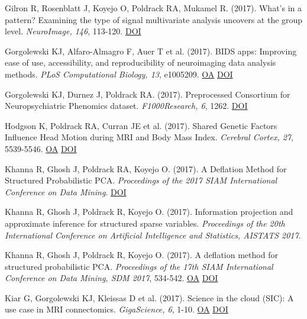 \documentclass[10pt, letterpaper]{article}
\begin{document}
Gilron R, Rosenblatt J, Koyejo O, Poldrack RA, Mukamel R.  (2017). What's in a pattern? Examining the type of signal multivariate analysis uncovers at the group level. \textit{NeuroImage, 146}, 113-120. \href{https://doi.org/10.1016/j.neuroimage.2016.11.019}{DOI} \vspace{2mm}

Gorgolewski KJ, Alfaro-Almagro F, Auer T et al. (2017). BIDS apps: Improving ease of use, accessibility, and reproducibility of neuroimaging data analysis methods. \textit{PLoS Computational Biology, 13}, e1005209. \href{https://www.ncbi.nlm.nih.gov/pmc/articles/PMC5363996}{OA} \href{https://doi.org/10.1371/journal.pcbi.1005209}{DOI} \vspace{2mm}

Gorgolewski KJ, Durnez J, Poldrack RA.  (2017). Preprocessed Consortium for Neuropsychiatric Phenomics dataset. \textit{F1000Research, 6}, 1262. \href{https://doi.org/10.12688/f1000research.11964.2}{DOI} \vspace{2mm}

Hodgson K, Poldrack RA, Curran JE et al. (2017). Shared Genetic Factors Influence Head Motion during MRI and Body Mass Index. \textit{Cerebral Cortex, 27}, 5539-5546. \href{https://www.ncbi.nlm.nih.gov/pmc/articles/PMC6075600}{OA} \href{https://doi.org/10.1093/cercor/bhw321}{DOI} \vspace{2mm}

Khanna R, Ghosh J, Poldrack RA, Koyejo O.  (2017). A Deflation Method for Structured Probabilistic PCA. \textit{Proceedings of the 2017 SIAM International Conference on Data Mining}. \href{https://doi.org/10.1137/1.9781611974973.60}{DOI} \vspace{2mm}

Khanna R, Ghosh J, Poldrack R, Koyejo O.  (2017). Information projection and approximate inference for structured sparse variables. \textit{Proceedings of the 20th International Conference on Artificial Intelligence and Statistics, AISTATS 2017}. \vspace{2mm}

Khanna R, Ghosh J, Poldrack R, Koyejo O.  (2017). A deflation method for structured probabilistic PCA. \textit{Proceedings of the 17th SIAM International Conference on Data Mining, SDM 2017}, 534-542. \href{https://doi.org/10.1137/1.9781611974973.60}{OA} \href{https://doi.org/10.1137/1.9781611974973.60}{DOI} \vspace{2mm}

Kiar G, Gorgolewski KJ, Kleissas D et al. (2017). Science in the cloud (SIC): A use case in MRI connectomics. \textit{GigaScience, 6}, 1-10. \href{https://www.ncbi.nlm.nih.gov/pmc/articles/PMC5467033}{OA} \href{https://doi.org/10.1093/gigascience/gix013}{DOI} \vspace{2mm}
\end{document}

